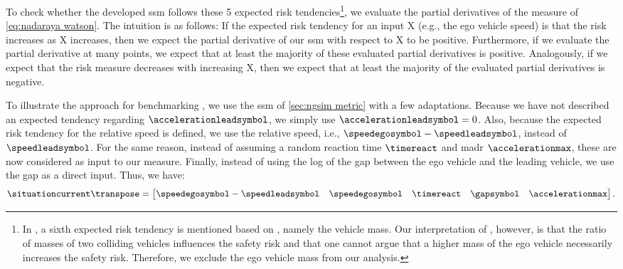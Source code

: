 To check whether the developed \ac{ssm} follows these 5 expected risk tendencies\footnote{In \autocite{mullakkal2017comparative}, a sixth expected risk tendency is mentioned based on \autocite{evans1994driver}, namely the vehicle mass. 
Our interpretation of \autocite{evans1994driver}, however, is that the ratio of masses of two colliding vehicles influences the safety risk and that one cannot argue that a higher mass of the ego vehicle necessarily increases the safety risk. 
Therefore, we exclude the ego vehicle mass from our analysis.}, we evaluate the partial derivatives of the measure of \cref{eq:nadaraya watson}.
The intuition is as follows: If the expected risk tendency for an input X (e.g., the ego vehicle speed) is that the risk increases as X increases, then we expect the partial derivative of our \ac{ssm} with respect to X to be positive.
Furthermore, if we evaluate the partial derivative at many points, we expect that at least the majority of these evaluated partial derivatives is positive.
Analogously, if we expect that the risk measure decreases with increasing X, then we expect that at least the majority of the evaluated partial derivatives is negative.

To illustrate the approach for benchmarking , we use the \ac{ssm} of \cref{sec:ngsim metric} with a few adaptations.
Because we have not described an expected tendency regarding $\accelerationleadsymbol$, we simply use $\accelerationleadsymbol=0$.
\cstarta Also, because the expected risk tendency for the relative speed is defined, we use the relative speed, i.e., $\speedegosymbol-\speedleadsymbol$, instead of $\speedleadsymbol$. 
For the same reason, \cenda instead of assuming a random reaction time $\timereact$ and \ac{madr} $\accelerationmax$, these are now considered as input to our measure. 
Finally, instead of using the log of the gap between the ego vehicle and the leading vehicle, we use the gap as a direct input.
Thus, we have:
\begin{equation}
	\label{eq:input partial derivatives}
	\situationcurrent\transpose = \begin{bmatrix}
		\speedegosymbol-\speedleadsymbol & \speedegosymbol & \timereact & \gapsymbol & \accelerationmax
	\end{bmatrix}.
\end{equation}

